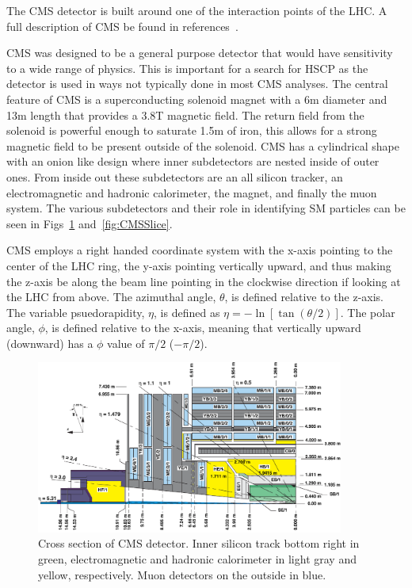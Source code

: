 The CMS detector is built around one of the interaction points of the LHC. A full description of CMS be found in 
references~\cite{Chatrchyan:2008zzk, Bayatian:922757}.

CMS was designed to be a general purpose detector that would have sensitivity to a wide range of physics. This is important for a search for HSCP as the detector
is used in ways not typically done in most CMS analyses.
The central feature of CMS is a superconducting solenoid magnet with a 6m diameter and 13m length that provides a 3.8T magnetic field. The return field from the solenoid
is powerful enough to saturate 1.5m of iron, this allows for a strong magnetic field to be present outside of the solenoid.
CMS has a cylindrical shape with an onion like design where inner subdetectors are nested inside of outer ones. From inside out these subdetectors are an all silicon
tracker, an electromagnetic and hadronic calorimeter, the magnet, and finally the muon system. The various subdetectors and their role in identifying
SM particles can be seen in Figs~\ref{fig:CMSPart} and~\ref{fig:CMSSlice}.

CMS employs a right handed coordinate system with the x-axis pointing to the center of the LHC ring, the y-axis pointing vertically upward, and thus making the z-axis
be along the beam line pointing in the clockwise direction if looking at the LHC from above. The azimuthal angle, $\theta$, is defined relative to the z-axis. The variable
psuedorapidity, $\eta$, is defined as $\eta = -\ln{[\tan{(\theta/2)}]}$. The polar angle, $\phi$, is defined relative to the x-axis, meaning that vertically
upward (downward) has a $\phi$ value of $\pi/2$ ($-\pi/2$).

\begin{figure}
  \begin{center}
      \includegraphics[clip=true, trim=0.0cm 0cm 3.0cm 0cm, width=0.9\textwidth]{figures/apparatus/CMS_LongView_noME42.pdf}
        \caption[Cross-section view of CMS detector]
        {Cross section of CMS detector. Inner silicon track bottom right in green, electromagnetic and hadronic calorimeter in light gray and yellow, respectively.
Muon detectors on the outside in blue.
         }
      \label{fig:CMSPart}
  \end{center}
\end{figure}


